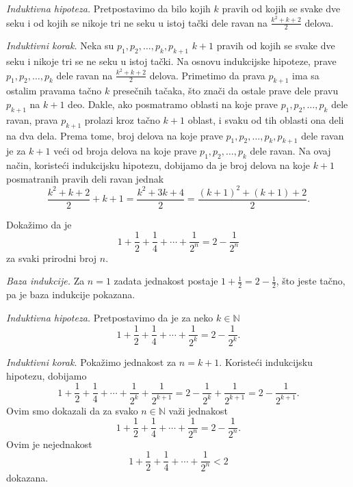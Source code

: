 {{\it Induktivna hipoteza.} Pretpostavimo da bilo kojih $k$ pravih od kojih se svake dve seku i od kojih se nikoje tri ne seku u istoj ta\v cki dele ravan na $\frac{k^2+k+2}2$ delova.

{\it Induktivni korak.} Neka su $p_1,p_2,\dots,p_k,p_{k+1}$ $k+1$ pravih od kojih se svake dve seku i nikoje tri se ne seku u istoj ta\v cki. Na osnovu indukcijske hipoteze, prave $p_1,p_2,\dots,p_k$ dele ravan na $\frac{k^2+k+2}2$ delova. Primetimo da prava $p_{k+1}$ ima sa ostalim pravama ta\v cno $k$ prese\v cnih ta\v caka, \v sto zna\v ci da ostale prave dele pravu $p_{k+1}$ na $k+1$ deo. Dakle, ako posmatramo oblasti na koje prave  $p_1,p_2,\dots,p_k$ dele ravan, prava $p_{k+1}$ prolazi kroz ta\v cno $k+1$ oblast, i svaku od tih oblasti ona deli na dva dela. Prema tome, broj delova na koje prave $p_1,p_2,\dots,p_k,p_{k+1}$ dele ravan je za $k+1$ ve\' ci od broja delova na koje prave $p_1,p_2,\dots,p_k$ dele ravan. Na ovaj na\v cin, koriste\' ci indukcijsku hipotezu, dobijamo da je broj delova na koje $k+1$ posmatranih pravih deli ravan jednak
\[\frac{k^2+k+2}2+k+1=\frac{k^2+3k+4}2=\frac{(k+1)^2+(k+1)+2}2.\]

 Doka\v zimo da je 
\[1+\frac 12+\frac 14+\cdots+\frac 1{2^n}=2-\frac 1{2^n}\]
za svaki prirodni broj $n$.

{\it Baza indukcije.} Za $n=1$ zadata jednakost postaje $1+\frac 12=2-\frac 12$, \v sto jeste ta\v cno, pa je baza indukcije pokazana.

{\it Induktivna hipoteza.} Pretpostavimo da je za neko $k\in\mathbb N$
\[1+\frac 12+\frac 14+\cdots+\frac 1{2^k}=2-\frac 1{2^k}.\]

{\it Induktivni korak.} Poka\v zimo jednakost za $n=k+1$. Koriste\' ci indukcijsku hipotezu, dobijamo
\[ 1+\frac 12+\frac 14+\cdots+\frac 1{2^k}+\frac 1{2^{k+1}}=2-\frac 1{2^k}+\frac 1{2^{k+1}}=2-\frac 1{2^{k+1}}. \]
Ovim smo dokazali da za svako $n\in\mathbb N$ va\v zi jednakost
\[1+\frac 12+\frac 14+\cdots+\frac 1{2^n}=2-\frac 1{2^n}.\]
Ovim je nejednakost
\[1+\frac 12+\frac 14+\cdots+\frac 1{2^n}<2\]
dokazana.

%
%



}
